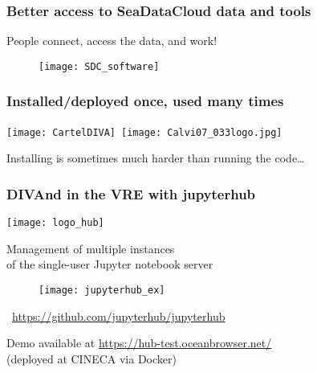 \begin{frame}[c]
\frametitle{Better access to SeaDataCloud data and tools}

People connect, access the data, and work!

\vspace{.5cm}

\begin{figure}
\centering
\texttt{[image: SDC\_software]}
\end{figure}


\end{frame}
\begin{frame}
\frametitle{Installed/deployed once, used many times}

\texttt{[image: CartelDIVA]}~\texttt{[image: Calvi07\_033logo.jpg]}

Installing is sometimes much harder than running the code\ldots 

\end{frame}


\begin{frame}[t]
\frametitle{DIVAnd in the VRE with jupyterhub}

\parbox{2cm}{
\texttt{[image: logo\_hub]}
}\parbox{8cm}{Management of multiple instances\\ of the single-user Jupyter notebook server}

\begin{figure}
\texttt{[image: jupyterhub\_ex]}
\end{figure}

\faGithub~\url{https://github.com/jupyterhub/jupyterhub}

Demo available at \url{https://hub-test.oceanbrowser.net/}\\ (deployed at CINECA via Docker)

\end{frame}

